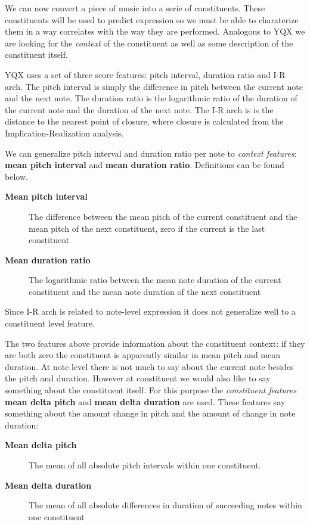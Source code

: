 \documentclass[a4paper,10pt]{article}
\begin{document}
We can now convert a piece of music into a serie of constituents. These constituents will be used to predict expression so we must be able to charaterize them in a way correlates with the way they are performed. Analogous to YQX we are looking for the \textit{context} of the constituent as well as some description of the constituent itself.

YQX uses a set of three score features: pitch interval, duration ratio and I-R arch. The pitch interval is simply the difference in pitch between the current note and the next note. The duration ratio is the logarithmic ratio of the duration of the current note and the duration of the next note.  The I-R arch is is the distance to the nearest point of closure, where closure is calculated from the Implication-Realization analysis. 

We can generalize pitch interval and duration ratio per note to \textit{context features}: \textbf{mean pitch interval} and \textbf{mean duration ratio}. Definitions can be found below. 
\begin{description}
\item[\textbf{Mean pitch interval}] 
The difference between the mean pitch of the current constituent and the mean pitch of the next constituent, zero if the current is the last constituent
\item[\textbf{Mean duration ratio}]
The logarithmic ratio between the mean note duration of the current constituent and the mean note duration of the next constituent
\end{description}

Since I-R arch is related to note-level expression it does not generalize well to a constituent level feature. 

The two features above provide information about the constituent context: if they are both zero the constituent is apparently similar in mean pitch and mean duration. At note level there is not much to say about the current note besides the pitch and duration. However at constituent we would also like to say something about the constituent itself. For this purpose the \textit{constituent features} \textbf{mean delta pitch} and \textbf{mean delta duration} are used. These features say something about the amount change in pitch and the amount of change in note duration:
\begin{description}
\item[\textbf{Mean delta pitch}] The mean of all absolute pitch intervals within one constituent. 
\item[\textbf{Mean delta duration}] The mean of all absolute differences in duration of succeeding notes within one constituent
\end{description}
\end{document}
